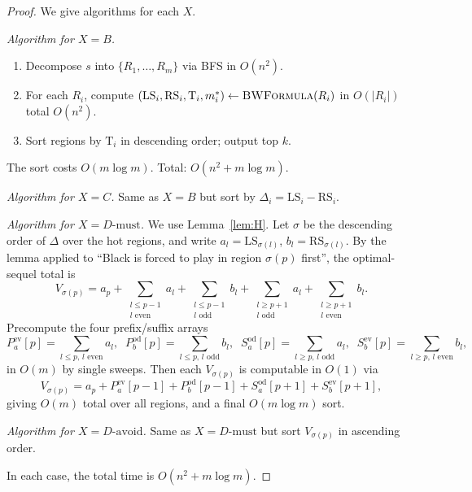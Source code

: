 \documentclass[11pt,a4paper]{amsart}
\theoremstyle{definition}
\theoremstyle{remark}
\newcommand{\LS}{\mathrm{LS}}
\newcommand{\RS}{\mathrm{RS}}
\newcommand{\Tt}{\mathrm{T}}
\begin{document}
\begin{proof}
We give algorithms for each $X$.

\smallskip\noindent\emph{Algorithm for $X = B$.}
\begin{enumerate}[label=\arabic*.]
\item Decompose $s$ into $\{R_1, \ldots, R_m\}$ via BFS in $O(n^2)$.
\item For each $R_i$, compute $(\LS_i, \RS_i, \Tt_i, m_i^*)
  \leftarrow \textsc{BWFormula}(R_i)$ in $O(|R_i|)$ total $O(n^2)$.
\item Sort regions by $\Tt_i$ in descending order; output top $k$.
\end{enumerate}
The sort costs $O(m \log m)$. Total: $O(n^2 + m \log m)$.

\smallskip\noindent\emph{Algorithm for $X = C$.}
Same as $X = B$ but sort by $\Delta_i = \LS_i - \RS_i$.

\smallskip\noindent\emph{Algorithm for $X = D\text{-must}$.}
We use Lemma~\ref{lem:H}. Let $\sigma$ be the descending order of
$\Delta$ over the hot regions, and write $a_l = \LS_{\sigma(l)}$,
$b_l = \RS_{\sigma(l)}$. By the lemma applied to ``Black is forced to
play in region $\sigma(p)$ first'', the optimal-sequel total is
\[
  V_{\sigma(p)} = a_p
  + \!\!\sum_{\substack{l \leq p-1 \\ l \text{ even}}}\!\! a_l
  + \!\!\sum_{\substack{l \leq p-1 \\ l \text{ odd}}}\!\! b_l
  + \!\!\sum_{\substack{l \geq p+1 \\ l \text{ odd}}}\!\! a_l
  + \!\!\sum_{\substack{l \geq p+1 \\ l \text{ even}}}\!\! b_l.
\]
Precompute the four prefix/suffix arrays
\[
  P_a^{\mathrm{ev}}[p] = \sum_{l \leq p,\, l \text{ even}} a_l,
  \;\;
  P_b^{\mathrm{od}}[p] = \sum_{l \leq p,\, l \text{ odd}} b_l,
  \;\;
  S_a^{\mathrm{od}}[p] = \sum_{l \geq p,\, l \text{ odd}} a_l,
  \;\;
  S_b^{\mathrm{ev}}[p] = \sum_{l \geq p,\, l \text{ even}} b_l,
\]
in $O(m)$ by single sweeps. Then each $V_{\sigma(p)}$ is computable in
$O(1)$ via
\[
  V_{\sigma(p)} = a_p + P_a^{\mathrm{ev}}[p-1] + P_b^{\mathrm{od}}[p-1]
    + S_a^{\mathrm{od}}[p+1] + S_b^{\mathrm{ev}}[p+1],
\]
giving $O(m)$ total over all regions, and a final $O(m \log m)$ sort.

\smallskip\noindent\emph{Algorithm for $X = D\text{-avoid}$.}
Same as $X = D\text{-must}$ but sort $V_{\sigma(p)}$ in ascending order.

In each case, the total time is $O(n^2 + m \log m)$.
\end{proof}
\end{document}
